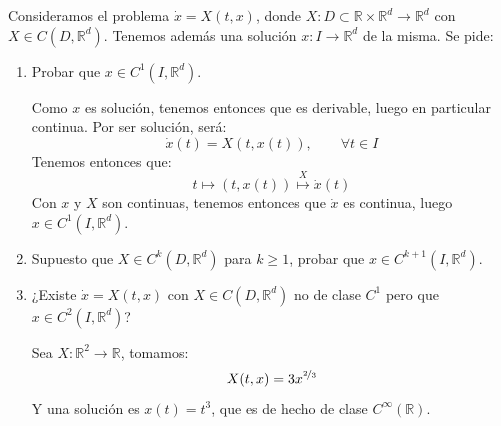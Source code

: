 \begin{ejercicio}
    Consideramos el problema $\dot{x} = X(t,x)$, donde $X:D\subset \mathbb{R}\times\mathbb{R}^d\to \mathbb{R}^d$ con $X\in C(D,\mathbb{R}^d)$. Tenemos además una solución $x:I\to \mathbb{R}^d$ de la misma. Se pide:
    \begin{enumerate}
        \item Probar que $x\in C^1(I,\mathbb{R}^d)$.

            Como $x$ es solución, tenemos entonces que es derivable, luego en particular continua. Por ser solución, será:
            \begin{equation*}
                \dot{x}(t) = X(t,x(t)), \qquad \forall t\in I
            \end{equation*}
            Tenemos entonces que:
            \begin{equation*}
                t\longmapsto (t,x(t)) \stackrel{X}{\longmapsto} \dot{x}(t)
            \end{equation*}
            Con $x$ y $X$ son continuas, tenemos entonces que $\dot{x}$ es continua, luego $x\in C^1(I,\mathbb{R}^d)$.
        \item Supuesto que $X\in C^k(D,\mathbb{R}^d)$ para $k\geq 1$, probar que $x\in C^{k+1}(I,\mathbb{R}^d)$. %
        \item ¿Existe $\dot{x} = X(t,x)$ con $X\in C(D,\mathbb{R}^d)$ no de clase $C^1$ pero que $x\in C^2(I,\mathbb{R}^d)$?

            Sea $X:\mathbb{R}^2\to \mathbb{R}$, tomamos:
            \begin{equation*}
                X(t,x) = 3x^{\nicefrac{2}{3}}
            \end{equation*}
            Y una solución es $x(t) = t^3$, que es de hecho de clase $C^\infty(\mathbb{R})$.
    \end{enumerate}
\end{ejercicio}

